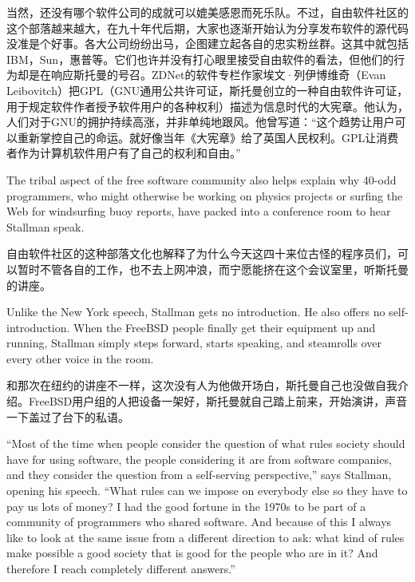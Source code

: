 \ifdefined\chs
当然，还没有哪个软件公司的成就可以媲美感恩而死乐队。不过，自由软件社区的这个部落越来越大，在九十年代后期，大家也逐渐开始认为分享发布软件的源代码没准是个好事。各大公司纷纷出马，企图建立起各自的忠实粉丝群。这其中就包括IBM，Sun，惠普等。它们也许并没有打心眼里接受自由软件的看法，但他们的行为却是在响应斯托曼的号召。ZDNet的软件专栏作家埃文·列伊博维奇（Evan Leibovitch）把GPL（GNU通用公共许可证，斯托曼创立的一种自由软件许可证，用于规定软件作者授予软件用户的各种权利）描述为信息时代的大宪章。他认为，人们对于GNU的拥护持续高涨，并非单纯地跟风。他曾写道：``这个趋势让用户可以重新掌控自己的命运。就好像当年《大宪章》给了英国人民权利。GPL让消费者作为计算机软件用户有了自己的权利和自由。''
\fi

\ifdefined\eng
The tribal aspect of the free software community also helps explain why 40-odd programmers, who might otherwise be working on physics projects or surfing the Web for windsurfing buoy reports, have packed into a conference room to hear Stallman speak.
\fi

\ifdefined\chs
自由软件社区的这种部落文化也解释了为什么今天这四十来位古怪的程序员们，可以暂时不管各自的工作，也不去上网冲浪，而宁愿能挤在这个会议室里，听斯托曼的讲座。
\fi

\ifdefined\eng
Unlike the New York speech, Stallman gets no introduction. He also offers no self-introduction. When the FreeBSD people finally get their equipment up and running, Stallman simply steps forward, starts speaking, and steamrolls over every other voice in the room.
\fi

\ifdefined\chs
和那次在纽约的讲座不一样，这次没有人为他做开场白，斯托曼自己也没做自我介绍。FreeBSD用户组的人把设备一架好，斯托曼就自己踏上前来，开始演讲，声音一下盖过了台下的私语。
\fi

\ifdefined\eng
``Most of the time when people consider the question of what rules society should have for using software, the people considering it are from software companies, and they consider the question from a self-serving perspective,'' says Stallman, opening his speech. ``What rules can we impose on everybody else so they have to pay us lots of money? I had the good fortune in the 1970s to be part of a community of programmers who shared software. And because of this I always like to look at the same issue from a different direction to ask: what kind of rules make possible a good society that is good for the people who are in it? And therefore I reach completely different answers.''
\fi

